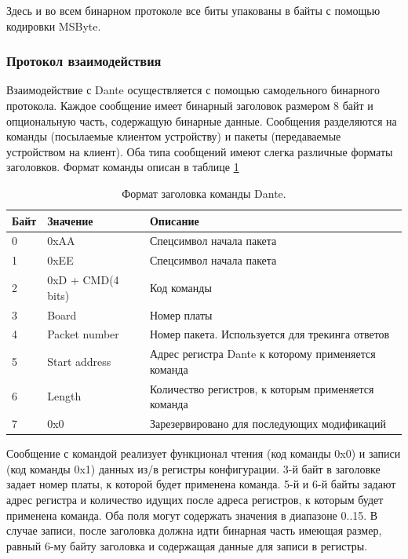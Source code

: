 \documentclass[a4paper,14pt]{extreport}
\begin{document}
Здесь и во всем бинарном протоколе все биты упакованы в байты с помощью кодировки MSByte.

\subsubsection{Протокол взаимодействия}
Взаимодействие с Dante осуществляется с помощью самодельного бинарного протокола. Каждое сообщение имеет бинарный заголовок размером 8 байт и опциональную часть, содержащую бинарные данные. Сообщения разделяются на команды (посылаемые клиентом устройству) и пакеты (передаваемые устройством на клиент). Оба типа сообщений имеют слегка различные форматы заголовков. Формат команды описан в таблице \ref{tab:dante-command-format}

\begin{table}
    \centering
    \begin{adjustbox}{width=\textwidth}
        \begin{tabular}{|l|l|l|}
            \hline
            Байт & Значение & Описание \\
            \hline
            0 & 0xAA & Спецсимвол начала пакета \\
            \hline
            1 & 0xEE & Спецсимвол начала пакета \\
            \hline
            2 & 0xD + CMD(4 bits) & Код команды \\
            \hline
            3 & Board & Номер платы \\
            \hline
            4 & Packet number & Номер пакета. Используется для трекинга ответов \\
            \hline
            5 & Start address & Адрес регистра Dante к которому применяется команда \\
            \hline
            6 & Length & Количество регистров, к которым применяется команда \\
            \hline
            7 & 0x0 & Зарезервировано для последующих модификаций \\
            \hline
        \end{tabular}
    \end{adjustbox}
    \caption{Формат заголовка команды Dante.}
    \label{tab:dante-command-format}
\end{table}

Сообщение с командой реализует функционал чтения (код команды 0x0) и записи (код команды 0x1) данных из/в регистры конфигурации. 3-й байт в заголовке задает номер платы, к которой будет применена команда. 5-й и 6-й байты задают адрес регистра и количество идущих после адреса регистров, к которым будет применена команда. Оба поля могут содержать значения в диапазоне 0..15. В случае записи, после заголовка должна идти бинарная часть имеющая размер, равный 6-му байту заголовка и содержащая данные для записи в регистры.
\end{document}
